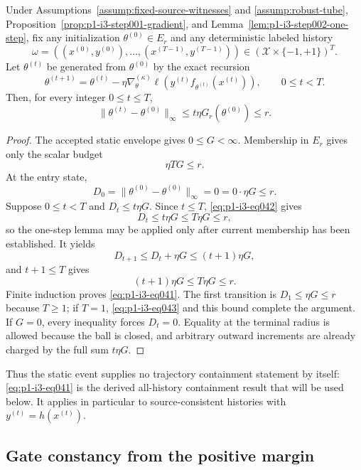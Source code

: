\begin{proposition}
\label{prop:p1-i3-step002-closed-tube}
Under Assumptions~\ref{assump:fixed-source-witnesses} and
\ref{assump:robust-tube}, Proposition~\ref{prop:p1-i3-step001-gradient},
and Lemma~\ref{lem:p1-i3-step002-one-step}, fix any initialization
$\theta^{(0)}\in E_r$ and any deterministic labeled history
\[
\omega=((x^{(0)},y^{(0)}),\ldots,(x^{(T-1)},y^{(T-1)}))
\in(\mathcal X\times\{-1,+1\})^T.
\]
Let $\theta^{(t)}$ be generated from $\theta^{(0)}$ by the exact recursion
\[
\theta^{(t+1)}=\theta^{(t)}-\eta\nabla_\theta^{(\kappa)}
\ell\!\left(y^{(t)}f_{\theta^{(t)}}(x^{(t)})\right),
\qquad 0\leq t<T.
\]
Then, for every integer $0\leq t\leq T$,
\[
\|\theta^{(t)}-\theta^{(0)}\|_\infty
\leq t\eta G_r(\theta^{(0)})\leq r.
\tag{41}\label{eq:p1-i3-eq041}
\]
\end{proposition}

\begin{proof}
The accepted static envelope gives $0\leq G<\infty$.  Membership in $E_r$
gives only the scalar budget
\[
\eta T G\leq r.
\tag{42}\label{eq:p1-i3-eq042}
\]
At the entry state,
\[
D_0=\|\theta^{(0)}-\theta^{(0)}\|_\infty=0=0\cdot\eta G\leq r.
\tag{43}\label{eq:p1-i3-eq043}
\]
Suppose $0\leq t<T$ and $D_t\leq t\eta G$.  Since $t\leq T$, \eqref{eq:p1-i3-eq042} gives
\[
D_t\leq t\eta G\leq T\eta G\leq r,
\tag{44}\label{eq:p1-i3-eq044}
\]
so the one-step lemma may be applied only after current membership has been
established.  It yields
\[
D_{t+1}\leq D_t+\eta G\leq(t+1)\eta G,
\tag{45}\label{eq:p1-i3-eq045}
\]
and $t+1\leq T$ gives
\[
(t+1)\eta G\leq T\eta G\leq r.
\tag{46}\label{eq:p1-i3-eq046}
\]
Finite induction proves \eqref{eq:p1-i3-eq041}.  The first transition is
$D_1\leq\eta G\leq r$ because $T\geq1$; if $T=1$, \eqref{eq:p1-i3-eq043} and this bound
complete the argument.  If $G=0$, every inequality forces $D_t=0$.  Equality
at the terminal radius is allowed because the ball is closed, and arbitrary
outward increments are already charged by the full sum $t\eta G$.
\end{proof}

Thus the static event supplies no trajectory containment statement by itself:
\eqref{eq:p1-i3-eq041} is the derived all-history containment result that will be used below.  It applies in
particular to source-consistent histories with $y^{(t)}=h(x^{(t)})$.

\subsection{Gate constancy from the positive margin}
\label{app:step003-gates}

